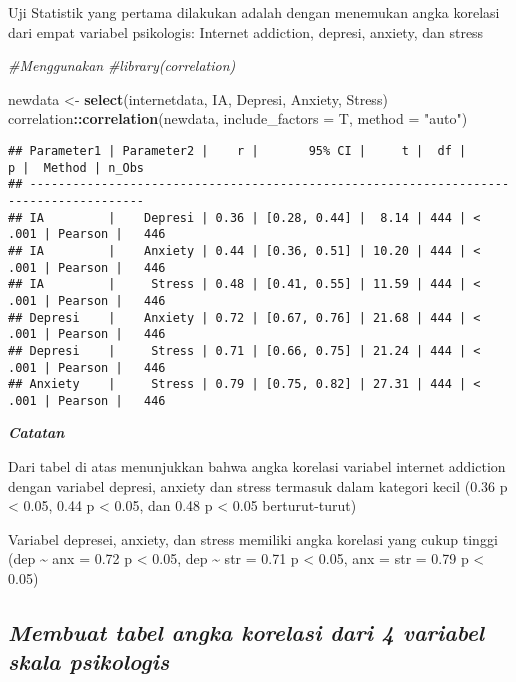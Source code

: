 \documentclass[
]{article}
\newenvironment{Shaded}{\begin{snugshade}}{\end{snugshade}}
\newcommand{\CommentTok}[1]{\textcolor[rgb]{0.56,0.35,0.01}{\textit{#1}}}
\newcommand{\DataTypeTok}[1]{\textcolor[rgb]{0.13,0.29,0.53}{#1}}
\newcommand{\KeywordTok}[1]{\textcolor[rgb]{0.13,0.29,0.53}{\textbf{#1}}}
\newcommand{\NormalTok}[1]{#1}
\newcommand{\OperatorTok}[1]{\textcolor[rgb]{0.81,0.36,0.00}{\textbf{#1}}}
\newcommand{\StringTok}[1]{\textcolor[rgb]{0.31,0.60,0.02}{#1}}
\begin{document}
Uji Statistik yang pertama dilakukan adalah dengan menemukan angka
korelasi dari empat variabel psikologis: Internet addiction, depresi,
anxiety, dan stress

\begin{Shaded}
\begin{Highlighting}[]
\CommentTok{#Menggunakan }
\CommentTok{#library(correlation)}

\NormalTok{newdata <-}\StringTok{ }\KeywordTok{select}\NormalTok{(internetdata, IA, Depresi, Anxiety, Stress)}
\NormalTok{correlation}\OperatorTok{::}\KeywordTok{correlation}\NormalTok{(newdata, }\DataTypeTok{include_factors =}\NormalTok{ T, }\DataTypeTok{method =} \StringTok{"auto"}\NormalTok{)}
\end{Highlighting}
\end{Shaded}

\begin{verbatim}
## Parameter1 | Parameter2 |    r |       95% CI |     t |  df |      p |  Method | n_Obs
## --------------------------------------------------------------------------------------
## IA         |    Depresi | 0.36 | [0.28, 0.44] |  8.14 | 444 | < .001 | Pearson |   446
## IA         |    Anxiety | 0.44 | [0.36, 0.51] | 10.20 | 444 | < .001 | Pearson |   446
## IA         |     Stress | 0.48 | [0.41, 0.55] | 11.59 | 444 | < .001 | Pearson |   446
## Depresi    |    Anxiety | 0.72 | [0.67, 0.76] | 21.68 | 444 | < .001 | Pearson |   446
## Depresi    |     Stress | 0.71 | [0.66, 0.75] | 21.24 | 444 | < .001 | Pearson |   446
## Anxiety    |     Stress | 0.79 | [0.75, 0.82] | 27.31 | 444 | < .001 | Pearson |   446
\end{verbatim}

\textbf{\emph{Catatan}}

Dari tabel di atas menunjukkan bahwa angka korelasi variabel internet
addiction dengan variabel depresi, anxiety dan stress termasuk dalam
kategori kecil (0.36 p \textless{} 0.05, 0.44 p \textless{} 0.05, dan
0.48 p \textless{} 0.05 berturut-turut)

Variabel depresei, anxiety, dan stress memiliki angka korelasi yang
cukup tinggi (dep \textasciitilde{} anx = 0.72 p \textless{} 0.05, dep
\textasciitilde{} str = 0.71 p \textless{} 0.05, anx = str = 0.79 p
\textless{} 0.05)

\hypertarget{membuat-tabel-angka-korelasi-dari-4-variabel-skala-psikologis}{%
\subsection{\texorpdfstring{\emph{Membuat tabel angka korelasi dari 4
variabel skala
psikologis}}{Membuat tabel angka korelasi dari 4 variabel skala psikologis}}\label{membuat-tabel-angka-korelasi-dari-4-variabel-skala-psikologis}}
\end{document}

